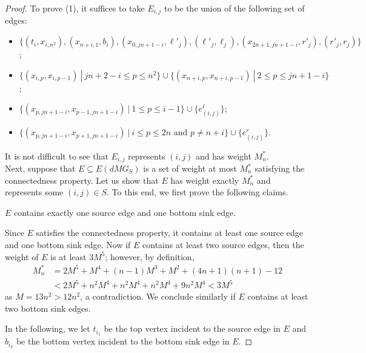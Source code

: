 \begin{proof}
To prove (1), it suffices to take $E_{i,j}$ to be the union of the following set of edges:
\begin{itemize}
\item $\{(t_i,x_{i,n^2}),(x_{n+i,1},b_i),(x_{0,jn+1-i},\ell'_j),(\ell'_j,\ell_j),(x_{2n+1,jn+1-i},r'_j),(r'_j,r_j)\}$;
\item $\{(x_{i,p},x_{i,p-1})~|~ jn+2-i\leq p \leq n^2\} \cup \{(x_{n+i,p},x_{n+i,p-1})~|~2 \leq p \leq jn+1-i\}$;
\item $\{(x_{p,jn+1-i},x_{p-1,jn+1-i})~|~ 1 \leq p \leq i-1\} \cup \{e^\ell_{(i,j)}\}$;
\item $\{(x_{p,jn+1-i},x_{p+1,jn+1-i})~|~i \leq p \leq 2n \text { and } p \neq n+i\} \cup \{e^r_{(i,j)}\}$.
\end{itemize}
It is not difficult to see that $E_{i,j}$ represents $(i,j)$ and has weight $M_n^*$.\\

Next, suppose that $E \subseteq E(dMG_S)$ is a set of weight at most $M_n^*$ satisfying the connectedness property. Let us show that $E$ has weight exactly $M_n^*$ and represents some $(i,j) \in S$. To this end, we first prove the following claims.

\begin{claim}
\label{clm:sourcesinkedges2}
$E$ contains exactly one source edge and one bottom sink edge.
\end{claim}

\begin{claimproof}
Since $E$ satisfies the connectedness property, it contains at least one source edge and one bottom sink edge. Now if $E$ contains at least two source edges, then the weight of $E$ is at least $3M^5$; however, by definition,
\begin{equation*}
\begin{split}
M_n^* &=  2M^5 + M^4 + (n-1)M^3 + M^2 + (4n+1)(n+1) - 12\\ 
& < 2M^5 + n^2M^4 + n^2M^4 + n^2M^4 + 9n^2M^4 < 3M^5
\end{split}
\end{equation*}
as $M = 13n^2 > 12n^2$, a contradiction. We conclude similarly if $E$ contains at least two bottom sink edges.
\end{claimproof}

In the following, we let $t_{i_1}$ be the top vertex incident to the source edge in $E$ and $b_{i_2}$ be the bottom vertex incident to the bottom sink edge in $E$. 


\end{proof}

